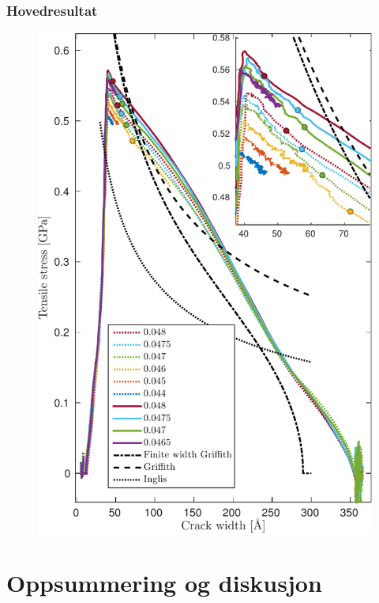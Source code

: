 \documentclass[utf8x, notes]{beamer}
\begin{document}
\subsection{}
\begin{frame}
\frametitle{Hovedresultat}
\begin{figure}
\includegraphics[height=0.95\textheight]{../figures/thesis/stress_area_lefm.pdf}
\end{figure}

\end{frame}


\section{Oppsummering og diskusjon}
\end{document}
